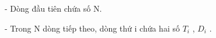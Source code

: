 - Dòng đầu tiên chứa số N.   


   - Trong N dòng tiếp theo, dòng thứ i chứa hai số $T_{i}$   , $D_{i}$   .